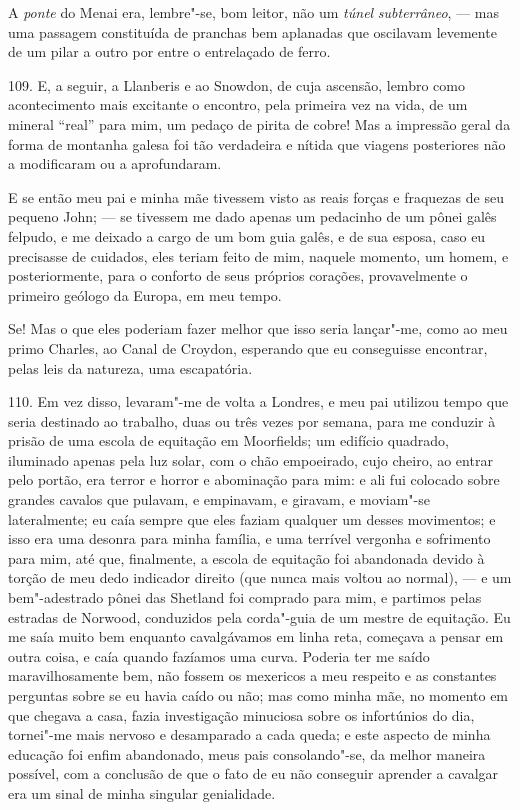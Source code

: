 A \emph{ponte} do Menai era, lembre"-se, bom leitor, não um \emph{túnel}
\emph{subterrâneo}, --- mas uma passagem constituída de pranchas bem
aplanadas que oscilavam levemente de um pilar a outro por entre o
entrelaçado de ferro.

109. E, a seguir, a Llanberis e ao Snowdon, de cuja ascensão, lembro
como acontecimento mais excitante o encontro, pela primeira vez na vida,
de um mineral ``real'' para mim, um pedaço de pirita de cobre! Mas a
impressão geral da forma de montanha galesa foi tão verdadeira e nítida
que viagens posteriores não a modificaram ou a aprofundaram.

E se então meu pai e minha mãe tivessem visto as reais forças e
fraquezas de seu pequeno John; --- se tivessem me dado apenas um
pedacinho de um pônei galês felpudo, e me deixado a cargo de um bom guia
galês, e de sua esposa, caso eu precisasse de cuidados, eles teriam
feito de mim, naquele momento, um homem, e posteriormente, para o
conforto de seus próprios corações, provavelmente o primeiro geólogo da
Europa, em meu tempo.

Se! Mas o que eles poderiam fazer melhor que isso seria lançar"-me, como
ao meu primo Charles, ao Canal de Croydon, esperando que eu conseguisse
encontrar, pelas leis da natureza, uma escapatória.

110. Em vez disso, levaram"-me de volta a Londres, e meu pai utilizou
tempo que seria destinado ao trabalho, duas ou três vezes por semana,
para me conduzir à prisão de uma escola de equitação em Moorfields; um
edifício quadrado, iluminado apenas pela luz solar, com o chão
empoeirado, cujo cheiro, ao entrar pelo portão, era terror e horror e
abominação para mim: e ali fui colocado sobre grandes cavalos que
pulavam, e empinavam, e giravam, e moviam"-se lateralmente; eu caía
sempre que eles faziam qualquer um desses movimentos; e isso era uma
desonra para minha família, e uma terrível vergonha e sofrimento para
mim, até que, finalmente, a escola de equitação foi abandonada devido à
torção de meu dedo indicador direito (que nunca mais voltou ao normal),
--- e um bem"-adestrado pônei das Shetland foi comprado para mim, e
partimos pelas estradas de Norwood, conduzidos pela corda"-guia de um
mestre de equitação. Eu me saía muito bem enquanto cavalgávamos em linha
reta, começava a pensar em outra coisa, e caía quando fazíamos uma
curva. Poderia ter me saído maravilhosamente bem, não fossem os
mexericos a meu respeito e as constantes perguntas sobre se eu havia
caído ou não; mas como minha mãe, no momento em que chegava a casa,
fazia investigação minuciosa sobre os infortúnios do dia, tornei"-me mais
nervoso e desamparado a cada queda; e este aspecto de minha educação foi
enfim abandonado, meus pais consolando"-se, da melhor maneira possível,
com a conclusão de que o fato de eu não conseguir aprender a cavalgar
era um sinal de minha singular genialidade.

